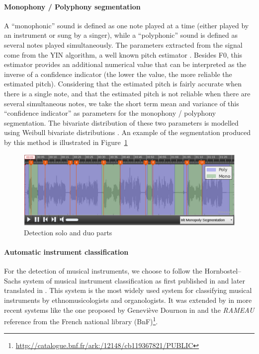 \documentclass{sig-alternate}
\newcommand{\squeezeup}{\vspace{-2.5mm}}
\begin{document}
\squeezeup\paragraph{Monophony / Polyphony segmentation}
A ``monophonic'' sound is defined as one note played at a time (either played by an instrument or sung by a singer), while a ``polyphonic'' sound is defined as several notes played simultaneously. The parameters extracted from the signal come from the YIN algorithm, a well known pitch estimator \cite{DeCheveigne2002}. Besides F0, this estimator provides an additional numerical value that can be interpreted as the inverse of a confidence indicator (the lower the value, the more reliable the estimated pitch). 
Considering that the estimated pitch is fairly accurate when there is a single note, and that the estimated pitch is not reliable when there are several simultaneous notes, we take the short term mean and variance of this ``confidence indicator'' as parameters for the monophony / polyphony segmentation. The bivariate distribution of these two parameters is modelled using Weibull bivariate distributions \cite{Lachambre2011}.
An example of the segmentation produced by this method is illustrated in Figure~\ref{fig:Monopoly}
\begin{figure}[htb]
  \centering
\includegraphics[width=0.95\linewidth]{img/SOLO_DUOdetection.png} 
 \caption{Detection solo and duo parts}
  \label{fig:Monopoly}
\end{figure}

\squeezeup\paragraph{Automatic instrument classification}
For the detection of musical instruments, we choose to follow the Hornbostel–Sachs system of musical instrument classification as first published in \cite{taxonomy_sachs2} and later translated in \cite{taxonomy_sachs}. This system is the most widely used system for classifying musical instruments by ethnomusicologists and organologists. It was extended by in more recent systems like the one proposed by Geneviève Dournon in \cite{Dournon92} and the \emph{RAMEAU} reference from the French national library (BnF)\footnote{\url{http://catalogue.bnf.fr/ark:/12148/cb119367821/PUBLIC}}.
\end{document}
